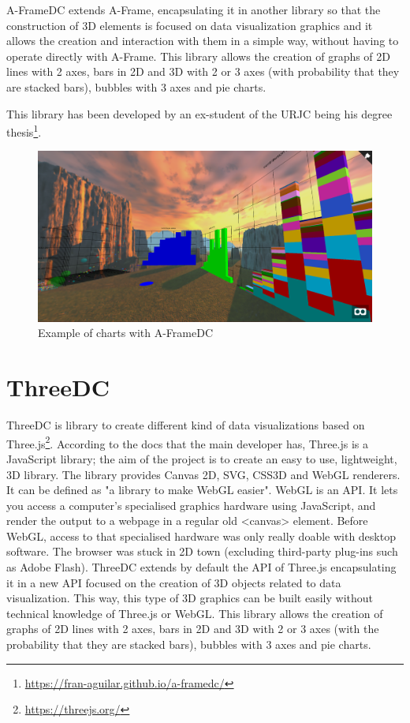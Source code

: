 \documentclass[a4paper, 12pt]{book}
\begin{document}
A-FrameDC extends A-Frame, encapsulating it in another library so that the construction of 3D elements is focused on data visualization graphics and it allows the creation and interaction with them in a simple way, without having to operate directly with A-Frame. This library allows the creation of graphs of 2D lines with 2 axes, bars in 2D and 3D with 2 or 3 axes (with probability that they are stacked bars), bubbles with 3 axes and pie charts.

This library has been developed by an ex-student of the URJC being his degree thesis\footnote{\url{https://fran-aguilar.github.io/a-framedc/}}.

\begin{figure}[H]
  \centering
  \includegraphics[width=16cm, keepaspectratio]{img/context/aframedc.PNG}
  \caption{Example of charts with A-FrameDC}
  \label{fig:pluginhtml}
\end{figure}



\section{ThreeDC}
\label{sec:threedc}

ThreeDC is library to create different kind of data visualizations based on Three.js\footnote{\url{https://threejs.org/}}. According to the docs that the main developer has, Three.js is a JavaScript library; the aim of the project is to create an easy to use, lightweight, 3D library. The library provides Canvas 2D, SVG, CSS3D and WebGL renderers. It can be defined as "a library to make WebGL easier". 
WebGL is an API. It lets you access a computer's specialised graphics hardware using JavaScript, and render the output to a webpage in a regular old <canvas> element. Before WebGL, access to that specialised hardware was only really doable with desktop software. The browser was stuck in 2D town (excluding third-party plug-ins such as Adobe Flash).
ThreeDC extends by default the API of Three.js encapsulating it in a new API focused on the creation of 3D objects related to data visualization. This way, this type of 3D graphics can be built easily without technical knowledge of Three.js or WebGL. This library allows the creation of graphs of 2D lines with 2 axes, bars in 2D and 3D with 2 or 3 axes (with the probability that they are stacked bars), bubbles with 3 axes and pie charts.
\end{document}
